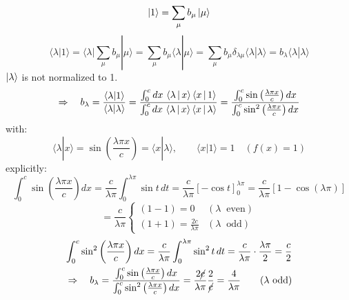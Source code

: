 \documentclass{article}
\begin{document}
\begin{equation}
    \ket{1} = \sum_\mu b_\mu \ket{\mu}
\end{equation}
\begin{equation}
    \langle \lambda | 1 \rangle
= \langle \lambda | \sum_\mu b_\mu | \mu \rangle
= \sum_\mu b_\mu \langle \lambda | \mu \rangle
= \sum_\mu b_\mu \delta_{\lambda \mu} \langle \lambda | \lambda \rangle
= b_\lambda \langle \lambda | \lambda \rangle
\end{equation}
$\ket{\lambda}$ is not normalized to 1.
\begin{equation}
    \Rightarrow \quad
b_\lambda = \frac{\langle \lambda | 1 \rangle}{\langle \lambda | \lambda \rangle}
= \frac{\int_0^c dx\, \Braket{\lambda|x} \Braket{x|1}}
       {\int_0^c dx\, \Braket{\lambda|x} \Braket{x|\lambda}}
= \frac{\int_0^c \sin\left( \frac{\lambda \pi x}{c} \right) dx}
        {\int_0^c \sin^2\left( \frac{\lambda \pi x}{c} \right) dx}
\end{equation}
with:
\begin{equation}
    \langle \lambda | x \rangle = \sin\left( \frac{\lambda \pi x}{c} \right) = \langle x | \lambda \rangle,
\qquad
\langle x | 1 \rangle = 1 \quad \left(f(x) = 1 \right)
\end{equation}
explicitly:
\begin{equation}
    \int_0^c \sin\left( \frac{\lambda \pi x}{c} \right) dx
= \frac{c}{\lambda \pi} \int_0^{\lambda \pi} \sin t\, dt
= \frac{c}{\lambda \pi} \left[ -\cos t \right]_0^{\lambda \pi}
= \frac{c}{\lambda \pi} \left[ 1 - \cos(\lambda \pi) \right]
\end{equation}
\begin{equation}
    = \frac{c}{\lambda \pi}\begin{cases}
        (1-1)=0 & (\lambda \ \text{ even})\\ (1+1) = \frac{2c}{\lambda \pi} & (\lambda\ \text{ odd})        
    \end{cases}
\end{equation}
\begin{align}
        \int_0^c \sin^2\left( \frac{\lambda \pi x}{c} \right) dx
= \frac{c}{\lambda \pi} \int_0^{\lambda \pi} \sin^2 t \, dt
= \frac{c}{\lambda \pi} \cdot \frac{\lambda \pi}{2}
= \frac{c}{2}\\
\Rightarrow \quad
b_\lambda = \frac{ \int_0^c \sin\left( \frac{\lambda \pi x}{c} \right) dx }
                 { \int_0^c \sin^2\left( \frac{\lambda \pi x}{c} \right) dx }
= \frac{2 \cancel{c}}{\lambda \pi} \frac{2}{\cancel{c}}
= \frac{4}{\lambda \pi}
\qquad (\lambda \text{ odd})
\end{align}
\newpage
\end{document}
